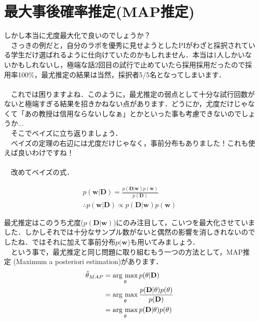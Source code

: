 \documentclass[11pt,a4paper]{ujreport} 	%
\newcommand{\argmax}{\mathop{\rm arg~max}\limits}
\begin{document}
\section{最大事後確率推定(MAP推定)}
しかし本当に尤度最大化で良いのでしょうか？\\
　さっきの例だと，自分のラボを優秀に見せようとしたPIがわざと採択されている学生だけ選ばれるように仕向けていたのかもしれません．本当は1人しかいないかもしれないし，極端な話2回目の試行で止めていたら採用採用だったので採用率100\%，最尤推定の結果は当然，採択者5/5名となってしまいます．\\
\\
　これでは困りますよね．このように，最尤推定の弱点として十分な試行回数がないと極端すぎる結果を招きかねない点があります．どうにか，尤度だけじゃなくて「あの教授は信用ならないしなぁ」とかといった事も考慮できないのでしょうか...\\
　そこでベイズに立ち返りましょう．\\
　ベイズの定理の右辺には尤度だけじゃなく，事前分布もありました！これも使えば良いわけですね！\\
\\
　改めてベイズの式．

\begin{align}
p(\mathbf{w}|\mathbf{D}) = \frac{p(\mathbf{D}|\mathbf{w})p(\mathbf{w})}{p(\mathbf{D})} \\
\therefore p(\mathbf{w}|\mathbf{D}) \propto p(\mathbf{D}|\mathbf{w})p(\mathbf{w})
\end{align}


最尤推定はこのうち尤度($p(\mathbf{D}|\mathbf{w})$)にのみ注目して，こいつを最大化させていました．しかしそれでは十分なサンプル数がないと偶然の影響を消しきれないのでしたね．ではそれに加えて事前分布$p(\mathbf{w}$)も用いてみましょう．\\
　という事で，最尤推定と同じ問題に取り組むもう一つの方法として，MAP推定 (Maximum a posteriori estimation)があります．\\

\begin{align}
\hat \theta_{MAP} &=\argmax_\theta p(\theta|\mathbf{D})\\
& = \argmax_\theta \frac{p(\mathbf{D}|\theta)p(\theta)}{p(\mathbf{D})}\\
&= \argmax_\theta p(\mathbf{D}|\theta)p(\theta)
\end{align}
\end{document}
